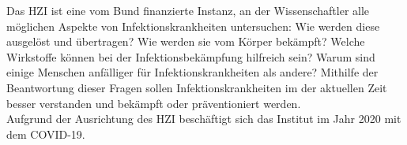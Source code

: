 Das \ac{HZI} ist eine vom Bund finanzierte Instanz, an der Wissenschaftler alle möglichen Aspekte von Infektionskrankheiten untersuchen:
Wie werden diese ausgelöst und übertragen?
Wie werden sie vom Körper bekämpft?
Welche Wirkstoffe können bei der Infektionsbekämpfung hilfreich sein?
Warum sind einige Menschen anfälliger für Infektionskrankheiten als andere?
Mithilfe der Beantwortung dieser Fragen sollen Infektionskrankheiten im der aktuellen Zeit besser verstanden und bekämpft oder präventioniert werden. 
\cite{HZI_about}
\\
Aufgrund der Ausrichtung des \ac{HZI} beschäftigt sich das Institut im Jahr 2020 mit dem \ac{COVID-19}.